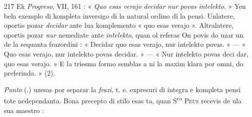 \begin{VUpage}[221]{217}
Ek \textit{Progreso}, VII, 161 : « \textit{Quo esas verajo decidar nur}\nl
\textit{povas intelekto.} » Yen bela exemplo di kompleta inversigo\nl
di la natural ordino di la pensi. Unlatere, oportis pozar\nl
\textit{decidar} ante lua komplemento « quo esas verajo ». Altralatere,\nl
oportis pozar \textit{nur} nemediate ante \textit{intelekto}, quan ol referas\nl
On povis do uzar un de la sequanta frazordini : « Decidar\nl
quo esas verajo, nur intelekto povas. » --- « Quo esas verajo,\nl
nur intelekto povas decidar. » --- « Nur intelekto povas deci\cc
dar, quo esas verajo. » E la triesma formo semblas a ni\nl
la maxim klara por omni, do preferinda. » (2).

\VUsaut{4.61mm}
\VUfilet{8.47mm}
\VUsaut{3.20mm}
\VUsaut{0.87mm}
\VUsaut{3.60mm}

\textit{Punto} (.) uzesas por separar la \textit{frazi}, t. e. expresuri di\nl
integra e kompleta pensi tote nedependanta. Bona precepto\nl
di stilo esas ta, quan S\textsuperscript{ro} \textsc{Peus} recevis de ula sua maestro :\nl
\end{VUpage}

